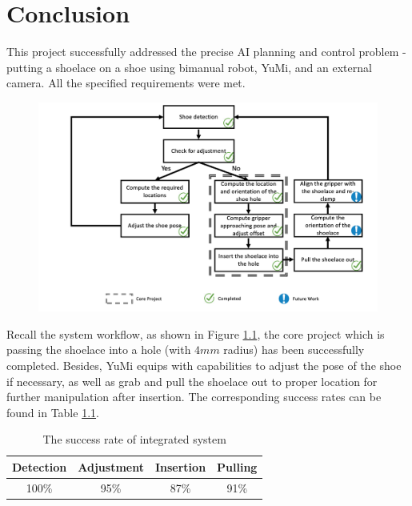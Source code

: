 \chapter{Conclusion}

This project successfully addressed the precise AI planning and control problem - putting a shoelace on a shoe using bimanual robot, YuMi, and an external camera. All the specified requirements were met.

\begin{figure}[H]
\centering
\includegraphics[width = \columnwidth]{conclusion/workflowcon.png}
\caption{}
\label{workflowcon}
\end{figure}

Recall the system workflow, as shown in Figure \ref{workflowcon}, the core project which is passing the shoelace into a hole (with $4mm$ radius) has been successfully completed. Besides, YuMi equips with capabilities to adjust the pose of the shoe if necessary, as well as grab and pull the shoelace out to proper location for further manipulation after insertion. The corresponding success rates can be found in Table \ref{sris}.

\begin{table}[H]
\centering
\begin{tabular}{||c|c|c|c||}
\hline
Detection & Adjustment & Insertion & Pulling \\ \hline\hline
100\% & 95\% & 87\% & 91\% \\ \hline
\end{tabular}
\caption{The success rate of integrated system}
\label{sris}
\end{table}

